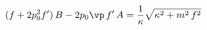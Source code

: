 \begin{equation}\label{a.2}
(f+2p^2_{0}f')\,B
 -2p_{0}\vp\,f'\,A
 =  \frac{1}{\kappa}\sqrt{\kappa^{2}+ m^2\, f^2}
\end{equation}

